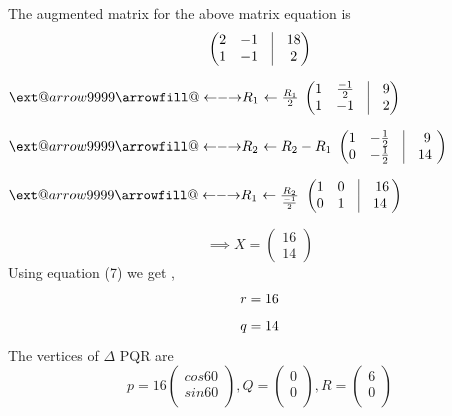 \documentclass[10pt,a4paper]{article}
\makeatletter
\newcommand\xleftrightarrow[2][]{%
  \ext@arrow 9999{\longleftrightarrowfill@}{#1}{#2}}
\newcommand\longleftrightarrowfill@{%
  \arrowfill@\leftarrow\relbar\rightarrow}
\makeatother
\begin{document}
\begin{multicols}{2}
{The augmented matrix for the above matrix equation is 
\vspace{3mm}
\begin{equation}
\begin{pmatrix}
  2 & -1 & \vrule & 18\\
  1 & -1  &\vrule & 2
    \end{pmatrix}  
    \end{equation}
    \begin{center}
   $\xleftrightarrow{\text{$R_1$ $\leftarrow  \frac{R_1}{2}$}}$
$ \begin{pmatrix}
  1 & \frac{-1}{2} & \vrule & 9\\
 1 & -1  &\vrule & 2	  
  \end{pmatrix}$ \\
   \end{center}
   \begin{center}
$ \xleftrightarrow{\text{$R_2$ $\leftarrow  {R_2}-{R_1}$}} $
$\begin{pmatrix}
 1 & - \frac{1}{2} & \vrule & 9\\
  0 & -\frac{1}{2}  &\vrule & 14\
  \end{pmatrix}$
  \\
  \end{center}
  \begin{center}
  $ \xleftrightarrow{\text{$R_1$ $\leftarrow  \frac{R_2}{\frac{-1}{2}}$}} $
$\begin{pmatrix}
  1 & 0 & \vrule & 16\\
  0 & 1  &\vrule & 14\
  \end{pmatrix}$
  \\
  \end{center}
  \begin{equation}
\implies X = 
   \begin{pmatrix}
   16 \\ 14
 \end{pmatrix}
 \end{equation}
Using equation (7) we get ,
\begin{equation}
	r = 16 \vspace{2mm}
\end{equation}
\begin{equation}
	q = 14 \vspace{2mm}
\end{equation}
The vertices of $\Delta$ PQR are \\
\begin{equation}
p= 16 \begin{pmatrix}
cos 60\\
sin 60\\
\end{pmatrix} 
,Q= \begin{pmatrix}
 0\\
 0\\
 \end{pmatrix} 
,R= \begin{pmatrix}
 6\\
 0\\
\end{pmatrix} 
\end{equation} \vspace{2mm}


}
\end{multicols}
\end{document}
